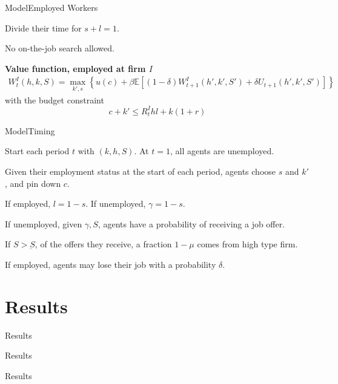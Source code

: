 \documentclass[notes, 10pt]{beamer}
\newenvironment{wideitemize}{\itemize\addtolength{\itemsep}{10pt}}{\enditemize}
\newenvironment{wideenumerate}{\enumerate\addtolength{\itemsep}{10pt}}{\endenumerate}
\begin{document}
	\begin{frame}{Model}{Employed Workers}
		\begin{wideitemize}
			\item Divide their time for $ s + l = 1 $.
			\item No on-the-job search allowed.
		\end{wideitemize}

		\vspace{0.5cm}
		
		\textbf{Value function, employed at firm $I$}
		\begin{align*}
			W^I_t(h,k,S) =  \max_{k',s} \left\{ u(c) + \beta\mathbb{E}\left[ (1 - \delta) W^I_{t+1}(h',k',S')
			+ \delta  U_{t+1}(h',k',S')  \right] \right\}
		\end{align*}
		with the budget constraint \[   c + k' \leq R^I_t h l + k(1 +r) \]
	\end{frame}

	\begin{frame}{Model}{Timing}
		\begin{wideenumerate}
			\item Start each period $t$ with $(k,h,S)$. At $t=1$, all agents are unemployed.
			\item Given their employment status at the start of each period, agents choose $s$ and $k'$, and pin down $c$.
			\item If employed, $l = 1 - s$. If unemployed, $\gamma = 1 - s$.
			\item If unemployed, given $\gamma, S$, agents have a probability of receiving a job offer.
			\item If $S > \underbar{S}$, of the offers they receive, a fraction $1 - \mu$ comes from high type firm.
			\item If employed, agents may lose their job with a probability $\delta$.
		\end{wideenumerate}
	\end{frame}
	
	\section{Results}
	\begin{frame}{Results}{}
		
	\end{frame}

	\begin{frame}{Results}{}
		
	\end{frame}


	\begin{frame}{Results}{}
		
	\end{frame}
\end{document}
